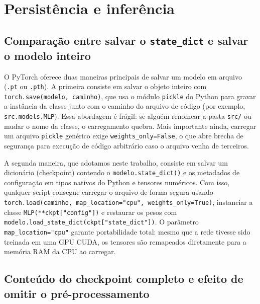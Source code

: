\documentclass[12pt,a4paper]{article}
\begin{document}
\section{Persistência e inferência}

\subsection{Comparação entre salvar o \texttt{state\_dict} e salvar o modelo inteiro}

O PyTorch oferece duas maneiras principais de salvar um modelo em arquivo (\texttt{.pt} ou \texttt{.pth}). A primeira consiste em salvar o objeto inteiro com \texttt{torch.save(modelo, caminho)}, que usa o módulo \texttt{pickle} do Python para gravar a instância da classe junto com o caminho do arquivo de código (por exemplo, \texttt{src.models.MLP}). Essa abordagem é frágil: se alguém renomear a pasta \texttt{src/} ou mudar o nome da classe, o carregamento quebra. Mais importante ainda, carregar um arquivo \texttt{pickle} genérico exige \texttt{weights\_only=False}, o que abre brecha de segurança para execução de código arbitrário caso o arquivo venha de terceiros.

A segunda maneira, que adotamos neste trabalho, consiste em salvar um dicionário (checkpoint) contendo o \texttt{modelo.state\_dict()} e os metadados de configuração em tipos nativos do Python e tensores numéricos. Com isso, qualquer script consegue carregar o arquivo de forma segura usando \texttt{torch.load(caminho, map\_location="cpu", weights\_only=True)}, instanciar a classe \texttt{MLP(**ckpt["config"])} e restaurar os pesos com \texttt{modelo.load\_state\_dict(ckpt["state\_dict"])}. O parâmetro \texttt{map\_location="cpu"} garante portabilidade total: mesmo que a rede tivesse sido treinada em uma GPU CUDA, os tensores são remapeados diretamente para a memória RAM da CPU ao carregar.

\subsection{Conteúdo do checkpoint completo e efeito de omitir o pré-processamento}
\end{document}
